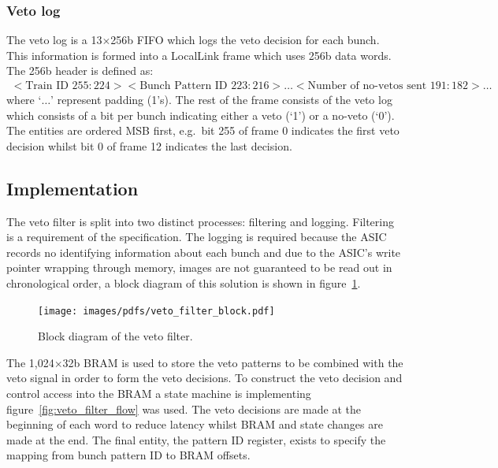 \subsubsection{Veto log} %
\label{sub:veto_locallink}
The veto log is a 13\( \times \)256b FIFO which logs the veto decision for each bunch. This information is formed into a LocalLink frame which uses 256b data words. The 256b header is defined as:
\begin{align}\label{fmt:ll_header}
  <\text{Train ID } 255:224><\text{Bunch Pattern ID } 223:216>\ldots<\text{Number of no-vetos sent } 191:182> \ldots
\end{align}
where `\( \dots \)' represent padding (1's). The rest of the frame consists of the veto log which consists of a bit per bunch indicating either a veto (`1') or a no-veto (`0'). The entities are ordered MSB first, e.g.\ bit 255 of frame 0 indicates the first veto decision whilst bit 0 of frame 12 indicates the last decision. 
\subsection{Implementation} %
\label{sub:veto_implementation}
The veto filter is split into two distinct processes: filtering and logging. Filtering is a requirement of the specification. The logging is required because the ASIC records no identifying information about each bunch and due to the ASIC's write pointer wrapping through memory, images are not guaranteed to be read out in chronological order, a block diagram of this solution is shown in figure~\ref{fig:veto_filter_entity}.
    
\begin{figure}[htbp]
  \centering
  \texttt{[image: images/pdfs/veto\_filter\_block.pdf]}
  \caption{Block diagram of the veto filter.}
  \label{fig:veto_filter_entity}
\end{figure}
    
The  1,024\( \times \)32b BRAM is used to store the veto patterns to be combined with the veto signal in order to form the veto decisions. To construct the veto decision and control access into the BRAM a state machine is implementing figure~\ref{fig:veto_filter_flow} was used. The veto decisions are made at the beginning of each word to reduce latency whilst BRAM and state changes are made at the end. The final entity, the pattern ID register, exists to specify the mapping from bunch pattern ID to BRAM offsets.
    
